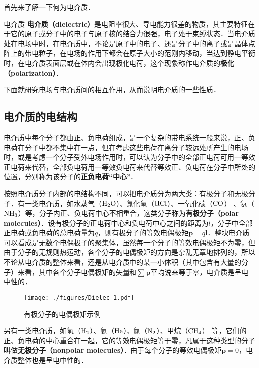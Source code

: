 
首先来了解一下何为电介质．
\begin{definition}{电介质}
\textbf{电介质（dielectric）}是电阻率很大、导电能力很差的物质，其主要特征在于它的原子或分子中的电子与原子核的结合力很强，电子处于束缚状态．当电介质处在电场中时，在电介质中，不论是原子中的电子、还是分子中的离子或是晶体点阵上的带电粒子，在电场的作用下都会在原子大小的范刚内移动，当达到静电平衡时，在电介质表面层或在体内会出现极化电荷，这个现象称作电介质的\textbf{极化（polarization）}．
\end{definition}
下面就研究电场与电介质间的相互作用，从而说明电介质的一些性质．

\subsection{电介质的电结构}

电介质中每个分子都由正、负电荷组成，是一个复杂的带电系统一般来说，正、负电荷在分子中都不集中在一点，但在考虑这些电荷在离分子较远处所产生的电场时，或是考虑一个分子受外电场作用时，可以认为分子中的全部正电荷可用一等效正电荷来代替，全部负电荷用一等效负电荷来代替等效正、负电荷在分子中所处的位置，分别称为该分子的\textbf{正负电荷“中心”}．

按照电介质分子内部的电结构不同，可以把电介质分为两大类：有极分子和无极分子．有一类电介质，如水蒸气（$\rm H_2O$）、氯化氢（$\rm HCl$）、一氧化碳（$\rm CO$） 、氨（$\rm NH_3$）等，分子内正、负电荷中心不相重合，这类分子称为\textbf{有极分子（polar molecules）}．设有极分子的正电荷中心和负电荷中心之间的距离为$l$，分子中全部正电荷或负电荷的总电荷量为$q$，则有极分子的等效电偶极矩$\mathbf p=q\mathbf l$．整块电介质可以看成是无数个电偶极子的聚集体，虽然每一个分子的等效电偶极矩不为零，但由于分子的无规则热运动，各个分子的电偶极矩的方向是杂乱无章地排列的，所以不论从电介质的整体来看，还是从电介质中的某一小体积（其中包含有大量的分子）来看，其中各个分子电偶极矩的矢量和$\sum \mathbf p$平均说来等于零，电介质是呈电中性的．
\begin{figure}[ht]
\centering
\texttt{[image: ./figures/Dielec\_1.pdf]}
\caption{有极分子的电偶极矩示例} \label{Dielec_fig1}
\end{figure}
另有一类电介质，如氢（$\rm H_2$）、氦（$\rm He$）、氮（$\rm N_2$）、甲烷（$\rm CH_4$） 等，它们的正、负电荷的中心重合在一起，它的等效电偶极矩等于零，凡属于这种类型的分子叫做\textbf{无极分子（nonpolar molecules）}．由于每个分子的等效电偶极矩$\mathbf p=0$，电介质整体也是呈电中性的．

